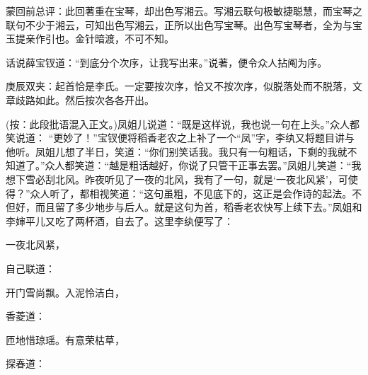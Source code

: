 \begin{parag}
    \begin{note}蒙回前总评：此回著重在宝琴，却出色写湘云。写湘云联句极敏捷聪慧，而宝琴之联句不少于湘云，可知出色写湘云，正所以出色写宝琴。出色写宝琴者，全为与宝玉提亲作引也。金针暗渡，不可不知。\end{note}
\end{parag}


\begin{parag}
    话说薛宝钗道：“到底分个次序，让我写出来。”说著，便令众人拈阄为序。\begin{note}庚辰双夹：起首恰是李氏。一定要按次序，恰又不按次序，似脱落处而不脱落，文章歧路如此。然后按次各各开出。\end{note}(按：此段批语混入正文。)凤姐儿说道：“既是这样说，我也说一句在上头。”众人都笑说道： “更妙了！”宝钗便将稻香老农之上补了一个“凤”字，李纨又将题目讲与他听。凤姐儿想了半日，笑道：“你们别笑话我。我只有一句粗话，下剩的我就不知道了。”众人都笑道：“越是粗话越好，你说了只管干正事去罢。”凤姐儿笑道：“我想下雪必刮北风。昨夜听见了一夜的北风，我有了一句，就是‘一夜北风紧’，可使得？”众人听了，都相视笑道：“这句虽粗，不见底下的，这正是会作诗的起法。不但好，而且留了多少地步与后人。就是这句为首，稻香老农快写上续下去。”凤姐和李婶平儿又吃了两杯酒，自去了。这里李纨便写了：
\end{parag}


\begin{poem}
    \begin{pl} 一夜北风紧，\end{pl}
\end{poem}


\begin{parag}
    自己联道：
\end{parag}


\begin{poem}
    \begin{pl} 开门雪尚飘。入泥怜洁白，\end{pl}
\end{poem}


\begin{parag}
    香菱道：
\end{parag}


\begin{poem}
    \begin{pl} 匝地惜琼瑶。有意荣枯草，\end{pl}
\end{poem}


\begin{parag}
    探春道：
\end{parag}


